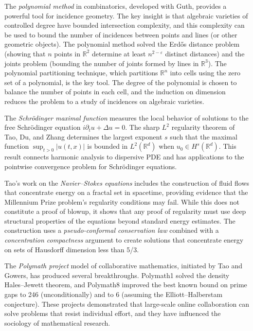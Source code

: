 The \emph{polynomial method} in combinatorics, developed with Guth, provides a powerful tool for incidence geometry. The key insight is that algebraic varieties of controlled degree have bounded intersection complexity, and this complexity can be used to bound the number of incidences between points and lines (or other geometric objects). The polynomial method solved the Erd\H{o}s distance problem (showing that $n$ points in $\mathbb{R}^2$ determine at least $n^{2-\varepsilon}$ distinct distances) and the joints problem (bounding the number of joints formed by lines in $\mathbb{R}^3$). The polynomial partitioning technique, which partitions $\mathbb{R}^n$ into cells using the zero set of a polynomial, is the key tool. The degree of the polynomial is chosen to balance the number of points in each cell, and the induction on dimension reduces the problem to a study of incidences on algebraic varieties.

The \emph{Schr\"{o}dinger maximal function} measures the local behavior of solutions to the free Schr\"{o}dinger equation $i\partial_t u + \Delta u = 0$. The sharp $L^2$ regularity theorem of Tao, Du, and Zhang determines the largest exponent $s$ such that the maximal function $\sup_{t > 0} |u(t,x)|$ is bounded in $L^2(\mathbb{R}^d)$ when $u_0 \in H^s(\mathbb{R}^d)$. This result connects harmonic analysis to dispersive PDE and has applications to the pointwise convergence problem for Schr\"{o}dinger equations.

Tao's work on the \emph{Navier--Stokes equations} includes the construction of fluid flows that concentrate energy on a fractal set in spacetime, providing evidence that the Millennium Prize problem's regularity conditions may fail. While this does not constitute a proof of blowup, it shows that any proof of regularity must use deep structural properties of the equations beyond standard energy estimates. The construction uses a \emph{pseudo-conformal conservation law} combined with a \emph{concentration compactness} argument to create solutions that concentrate energy on sets of Hausdorff dimension less than 5/3.

The \emph{Polymath project} model of collaborative mathematics, initiated by Tao and Gowers, has produced several breakthroughs. Polymath1 solved the density Hales--Jewett theorem, and Polymath8 improved the best known bound on prime gaps to 246 (unconditionally) and to 6 (assuming the Elliott--Halberstam conjecture). These projects demonstrated that large-scale online collaboration can solve problems that resist individual effort, and they have influenced the sociology of mathematical research.

